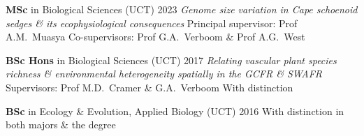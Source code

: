 \begin{hangparas}{2em}{1}

\textbf{MSc} in Biological Sciences (UCT)                     \hfill 2023 \break
\textit{Genome size variation in Cape schoenoid sedges
\& its ecophysiological consequences}                                     \break
Principal supervisor: Prof A.M.~Muasya                                    \break
Co-supervisors: Prof G.A.~Verboom \& Prof A.G.~West

\textbf{BSc Hons} in Biological Sciences (UCT)                \hfill 2017 \break
\textit{Relating vascular plant species richness \&
  environmental heterogeneity spatially in the GCFR \& SWAFR}             \break
Supervisors: Prof M.D.~Cramer \& G.A.~Verboom                             \break
With distinction

\textbf{BSc} in Ecology \& Evolution, Applied Biology (UCT)   \hfill 2016 \break
With distinction in both majors \& the degree

\hfill

\end{hangparas}

